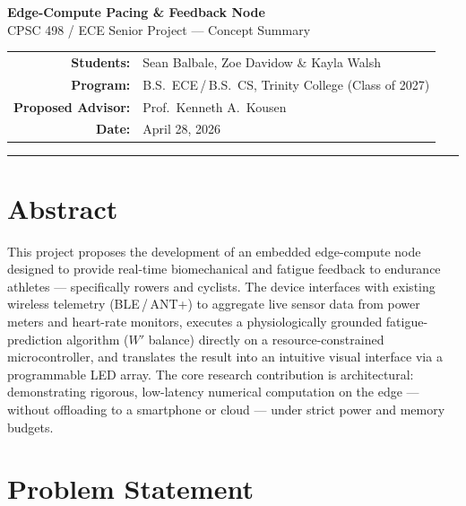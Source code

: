 \documentclass[11pt, letterpaper]{article}
\begin{document}
\begin{center}
  {\LARGE\bfseries\color{trinityblue} Edge-Compute Pacing \& Feedback Node}\\[0.5em]
  {\large\color{darkgray} CPSC 498 / ECE Senior Project --- Concept Summary}\\[0.8em]
  \begin{tabular}{rl}
    \textbf{Students:}         & Sean Balbale, Zoe Davidow \& Kayla Walsh \\
    \textbf{Program:}          & B.S.\ ECE\,/\,B.S.\ CS, Trinity College (Class of 2027) \\
    \textbf{Proposed Advisor:} & Prof.\ Kenneth A.\ Kousen \\
    \textbf{Date:}             & April 28, 2026
  \end{tabular}
\end{center}

\vspace{0.3em}
\noindent\rule{\linewidth}{1.2pt}
\vspace{0.3em}

\section{Abstract}

This project proposes the development of an embedded edge-compute node designed to provide
real-time biomechanical and fatigue feedback to endurance athletes --- specifically rowers and
cyclists. The device interfaces with existing wireless telemetry (BLE\,/\,ANT+) to aggregate
live sensor data from power meters and heart-rate monitors, executes a physiologically grounded
fatigue-prediction algorithm ($W'$ balance) directly on a resource-constrained microcontroller,
and translates the result into an intuitive visual interface via a programmable LED array.
The core research contribution is architectural: demonstrating rigorous, low-latency numerical
computation on the edge --- without offloading to a smartphone or cloud --- under strict power
and memory budgets.

\section{Problem Statement}
\end{document}
